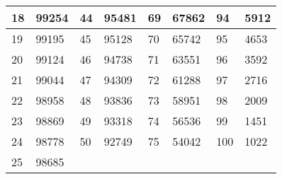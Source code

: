 \documentclass[11pt,wide]{mwart}
\begin{document}
\begin{table}[!htbp]
\begin{tabular}{|l|l|l|l|l|l|l|l|}
		18  & 99254  & 44  & 95481 & 69  & 67862 & 94  & 5912  \\ \hline
		19  & 99195  & 45  & 95128 & 70  & 65742 & 95  & 4653  \\ \hline
		20  & 99124  & 46  & 94738 & 71  & 63551 & 96  & 3592  \\ \hline
		21  & 99044  & 47  & 94309 & 72  & 61288 & 97  & 2716  \\ \hline
		22  & 98958  & 48  & 93836 & 73  & 58951 & 98  & 2009  \\ \hline
		23  & 98869  & 49  & 93318 & 74  & 56536 & 99  & 1451  \\ \hline
		24  & 98778  & 50  & 92749 & 75  & 54042 & 100 & 1022  \\ \hline
		25  & 98685  &     &       &     &       &     &       \\ \hline
	\end{tabular}
\end{table}
\end{document}
